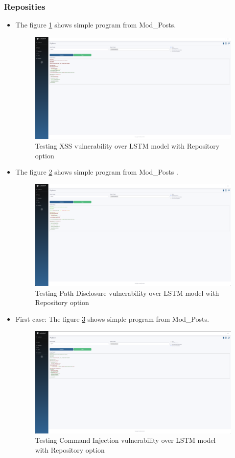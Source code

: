 \subsubsection{Reposities}
\begin{itemize}
    \item The figure \ref{img:lstmrepoxss} shows simple program from Mod\_Posts.
    \begin{figure}[H]
        \centering
        \includegraphics[width=0.6\linewidth]{images/lstm-repo-xss.png}
        \caption{Testing XSS vulnerability over LSTM model with Repository option}
        \label{img:lstmrepoxss}
    \end{figure}

    \item The figure \ref{img:lstmrepopd} shows simple program from Mod\_Posts \cite{vulpy}.
    \begin{figure}[H]
        \centering
        \includegraphics[width=0.6\linewidth]{images/lstm-repo-pd.png}
        \caption{Testing Path Disclosure vulnerability over LSTM model with Repository option}
        \label{img:lstmrepopd}
    \end{figure}

    \item First case: The figure \ref{img:lstmrepoci} shows simple program from Mod\_Posts.
    \begin{figure}[H]
        \centering
        \includegraphics[width=0.6\linewidth]{images/lstm-repo-ci.png}
        \caption{Testing Command Injection vulnerability over LSTM model with Repository option}
        \label{img:lstmrepoci}
    \end{figure}


\end{itemize}
